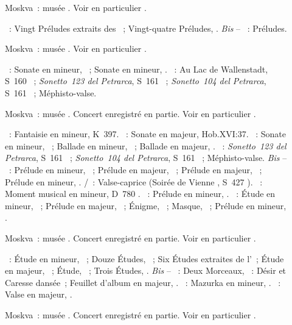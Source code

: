 \begin{description}
 \item[]
 Moskva~: musée \Scriabine{}.
 Voir en particulier \citet[p.~450]{Milshteyn82a}.

 \textsc{\Scriabine{}}~: Vingt Préludes extraits des ~; Vingt-quatre Préludes, .
 \emph{Bis} -- \textsc{\Scriabine{}}~: Préludes.
 \item[]
 Moskva~: musée \Scriabine{}.
 Voir en particulier \citet[p.~450]{Milshteyn82a}.

 \textsc{\Beethoven{}}~: Sonate en \kC \Sharp mineur,  ~;
 Sonate en \kC mineur, .
 \textsc{\Liszt{}}~: Au Lac de Wallenstadt, S~160 ~;
 \emph{Sonetto~123 del Petrarca}, S~161 ~; \emph{Sonetto~104 del
 Petrarca}, S~161 ~; Méphisto-valse.
 \item[]
 Moskva~: musée \Scriabine{}.
 Concert enregistré en partie.
 Voir en particulier \citet[p.~450]{Milshteyn82a}.

 \textsc{\Mozart{}}~: Fantaisie en \kD mineur, K~397.
 \textsc{\Haydn{}}~: Sonate en \kD majeur, Hob.XVI:37.
 \textsc{\Chopin{}}~: Sonate en \kB \Flat mineur, ~; Ballade en \kG
 mineur, ~; Ballade en \kA \Flat majeur, .
 \textsc{\Liszt{}}~: \emph{Sonetto~123 del Petrarca}, S~161 ~;
 \emph{Sonetto~104 del Petrarca}, S~161 ~; Méphisto-valse.
 \emph{Bis} -- \textsc{\Scriabine{}}~: Prélude en \kB mineur, 
 ~; Prélude en \kD majeur,  ~; Prélude en \kB
 majeur,  ~; Prélude en \kE mineur,  .
 \textsc{\Schubert{}/\Liszt{}}~: Valse-caprice (Soirée de Vienne ,
 S~427 ).
 \textsc{\Schubert{}}~: Moment musical en \kF mineur, D~780 .
 \textsc{\Chopin{}}~: Prélude en \kE \Flat mineur,  .
 \textsc{\Scriabine{}}~: Étude en \kB \Flat mineur,  ~;
 Prélude en \kF \Sharp majeur,  ~; Énigme, 
 ~; Masque,  ~; Prélude en \kF mineur,
  .
 \item[]
 Moskva~: musée \Scriabine{}.
 Concert enregistré en partie.
 Voir en particulier \citet[p.~450]{Milshteyn82a}.

 \textsc{\Scriabine{}}~: Étude en \kC \Sharp mineur,  ~;
 Douze Études, ~; Six Études extraites de l'~; Étude en \kE
 \Flat majeur,  ~; Étude,  ~; Trois
 Études, .
 \emph{Bis} -- \textsc{\Scriabine{}}~: Deux Morceaux, ~: 
 Désir et  Caresse dansée~; Feuillet d'album en \kE \Flat majeur,
  .
 \textsc{\Chopin{}}~: Mazurka en \kF mineur,  .
 \textsc{\Scriabine{}}~: Valse en \kA \Flat majeur, .
 \item[]
 Moskva~: musée \Scriabine{}.
 Concert enregistré en partie.
 Voir en particulier \citet[p.~450]{Milshteyn82a}.


\end{description}
